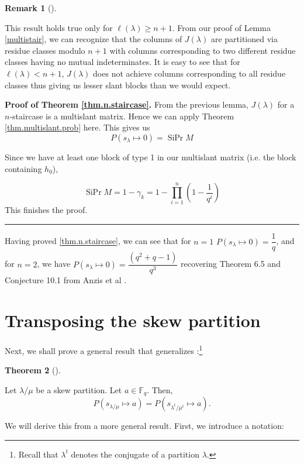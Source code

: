 \documentclass[numbers=enddot,12pt,final,onecolumn,notitlepage]{scrartcl}%
\theoremstyle{definition}
\newtheorem{theo}{Theorem}[section]
\newenvironment{theorem}[1][]
{\begin{theo}[#1]\begin{leftbar}}
{\end{leftbar}\end{theo}}
\newtheorem{remk}[theo]{Remark}
\newenvironment{remark}[1][]
{\begin{remk}[#1]\begin{leftbar}}
{\end{leftbar}\end{remk}}
\newenvironment{proof}[1][Proof]{\noindent\textbf{#1.} }{\ \rule{0.5em}{0.5em}}
\let\prodnonlimits\prod
\renewcommand{\prod}{\prodnonlimits\limits}
\renewcommand{\geq}{\geqslant}
\theoremstyle{plainsl}
\begin{document}
\begin{remark}
\label{rem.sizenstairs}
This result holds true only for $\ell(\lambda) \geq n+1$. From our proof of Lemma \ref{multistair}, we can recognize that the columns of $J(\lambda)$ are partitioned via residue classes modulo $n+1$ with columns corresponding to two different residue classes having no mutual indeterminates. It is easy to see that for $\ell(\lambda) < n+1$, $J(\lambda)$ does not achieve columns corresponding to all residue classes thus giving us lesser slant blocks than we would expect.

\end{remark}

\begin{proof}[Proof of Theorem \ref{thm.n.staircase}]
From the previous lemma, $J(\lambda)$ for a $n$-staircase is a multislant matrix. Hence we can apply Theorem \ref{thm.multislant.prob} here. This gives us  
\[
P(s_{\lambda} \longmapsto 0) = \operatorname*{SiPr}M
\]

Since we have at least one block of type 1 in our multislant matrix (i.e. the block containing $h_0$), 

\[\operatorname*{SiPr}M=1-\gamma_{k} = 1-\prod_{i=1}^{n} \left(  1-\dfrac{1}{q^{i}}\right) 
\]
This finishes the proof. 
\end{proof}

Having proved \ref{thm.n.staircase}, we can see that  for $n=1$
$P(s_{\lambda} \longmapsto 0) = \dfrac{1}{q}$, and for $n=2$, we have $P(s_{\lambda} \longmapsto 0) = \dfrac{(q^2+q -1)}{q^3}$
recovering Theorem 6.5 and Conjecture 10.1 from Anzis et al \cite{Anzis18}.


\section{Transposing the skew partition}

Next, we shall prove a general result that generalizes \cite[Corollary
3.3]{Anzis18}:\footnote{Recall that $\lambda^{t}$ denotes the conjugate of a
partition $\lambda$.}

\begin{theorem}
\label{thm.transpose}Let $\lambda/\mu$ be a skew partition. Let $a\in
\mathbb{F}_{q}$. Then,
\[
P\left(  s_{\lambda/\mu}\mapsto a\right)  =P\left(  s_{\lambda^{t}/\mu^{t}%
}\mapsto a\right)  .
\]

\end{theorem}

We will derive this from a more general result. First, we introduce a notation:
\end{document}
